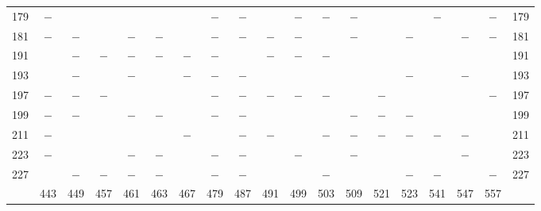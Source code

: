 \begin{center}
\begin{tabular}{r|c|c|c|c|c|c|c|c|c|c|c|c|c|c|c|c|c|r}
179 & $-$ &  &  &  &  &  & $-$ & $-$ &  & $-$ & $-$ & $-$ &  &  & $-$ &  & $-$ & 179\\
181 & $-$ & $-$ &  & $-$ & $-$ &  & $-$ & $-$ & $-$ & $-$ &  & $-$ &  & $-$ &  & $-$ & $-$ & 181\\
191 &  & $-$ & $-$ & $-$ & $-$ & $-$ & $-$ &  & $-$ & $-$ & $-$ &  &  &  &  &  &  & 191\\
193 &  & $-$ &  & $-$ &  & $-$ & $-$ & $-$ &  &  &  &  &  & $-$ &  & $-$ &  & 193\\
197 & $-$ & $-$ & $-$ &  &  &  & $-$ & $-$ & $-$ & $-$ & $-$ &  & $-$ &  &  &  & $-$ & 197\\
199 & $-$ & $-$ &  & $-$ & $-$ &  & $-$ & $-$ &  &  &  & $-$ & $-$ & $-$ &  &  &  & 199\\
211 & $-$ &  &  &  &  & $-$ &  & $-$ & $-$ &  & $-$ & $-$ & $-$ & $-$ & $-$ & $-$ &  & 211\\
223 & $-$ &  &  & $-$ & $-$ &  & $-$ & $-$ &  & $-$ &  & $-$ &  &  &  & $-$ &  & 223\\
227 &  & $-$ & $-$ & $-$ & $-$ &  & $-$ & $-$ &  &  & $-$ &  &  & $-$ & $-$ &  & $-$ & 227\\
\hline
 & 443 & 449 & 457 & 461 & 463 & 467 & 479 & 487 & 491 & 499 & 503 & 509 & 521 & 523 & 541 & 547 & 557 & \\
\hline
\end{tabular}\endgroup\end{center}

